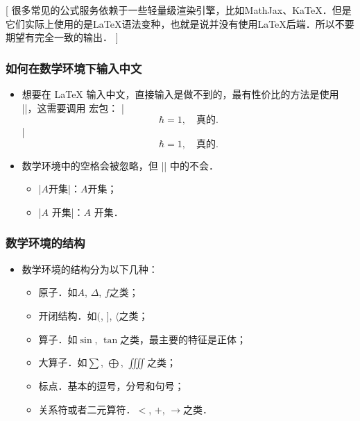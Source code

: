
[%
	很多常见的公式服务依赖于一些轻量级渲染引擎，比如MathJax、KaTeX．但是它们实际上使用的是\LaTeX{}语法变种，也就是说并没有使用\LaTeX{}后端．所以不要期望有完全一致的输出．%
]


\begin{frame}[fragile]
	\frametitle{如何在数学环境下输入中文}
	\begin{itemize}
		\item<+-> 想要在 \LaTeX{} 输入中文，直接输入是做不到的，最有性价比的方法是使用 ||，这需要调用  宏包：
			|\[\hbar=1,\quad \text{真的}.\]|
			\[\hbar=1,\quad \text{真的}.\]
		\item<+-> 数学环境中的空格会被忽略，但 || 中的不会．
			\begin{itemize}
				\item |$A \text{开集}$|：$A\text{开集}$；
				\item |$A\text{ 开集}$|：$A\text{ 开集}$．
			\end{itemize}
	\end{itemize}
\end{frame}

\begin{frame}[fragile]
	\frametitle{数学环境的结构}
	\begin{itemize}
		\item 数学环境的结构分为以下几种：
		      \begin{itemize}
			      \item 原子．如$A$, $\Delta $, $f$之类；
			      \item 开闭结构．如$($, $]$, $\langle$之类；
			      \item 算子．如$\sin$, $\tan$之类，最主要的特征是\alert{正体}；
			      \item 大算子．如$\sum$, $\bigoplus$, $\iiiint$之类；
			      \item 标点．基本的逗号，分号和句号；
			      \item 关系符或者二元算符．$<$, $+$, $\to$之类．
		      \end{itemize}
	\end{itemize}
\end{frame}

